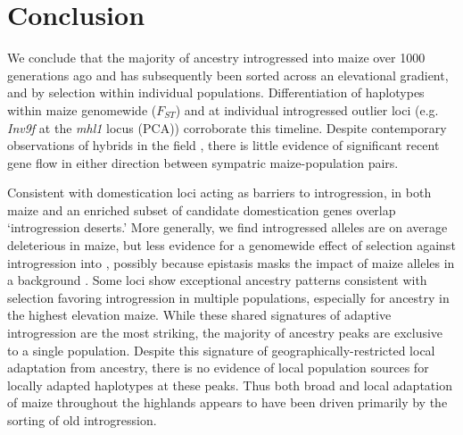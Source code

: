 \section*{Conclusion}
 We conclude that the majority of \mexicana ancestry introgressed into maize over 1000 generations ago and has subsequently been sorted across an elevational gradient, and by selection within individual populations.
 Differentiation of \mexicana haplotypes within maize genomewide ($F_{ST}$) and at individual introgressed outlier loci (e.g. \textit{Inv9f} at the \textit{mhl1} locus (PCA)) corroborate this timeline.
 Despite contemporary observations of  hybrids in the field \cite{Wilkes:1967}, there is little evidence of significant recent gene flow in either direction between sympatric maize-\mexicana population pairs. 

 Consistent with domestication loci acting as barriers to introgression, in both maize and \mexicana an enriched subset of candidate domestication genes overlap ‘introgression deserts.'
 More generally, we find introgressed \mexicana alleles are on average deleterious in maize, but less evidence for a genomewide effect of selection against introgression into \mexicana, possibly because epistasis masks the impact of maize alleles in a \mexicana background \cite{Stitzer_Ibarra:2018}.
 Some loci show exceptional ancestry patterns consistent with selection favoring introgression in multiple populations, especially for \mexicana ancestry in the highest elevation maize. 
 While these shared signatures of adaptive introgression are the most striking, the majority of ancestry peaks are exclusive to a single population.
Despite this signature of geographically-restricted local adaptation from \mexicana ancestry, there is no evidence of local population sources for locally adapted haplotypes at these peaks. Thus both broad and local adaptation of maize throughout the highlands appears to have been driven primarily by the sorting of old introgression.


